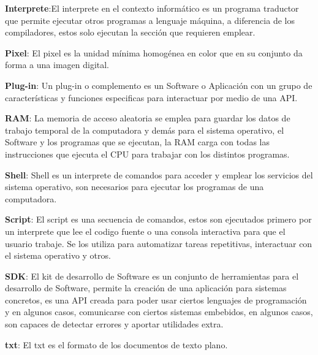 \textbf{Interprete}:El interprete en el contexto informático es un programa traductor que permite ejecutar otros programas a lenguaje máquina, a diferencia de los compiladores, estos solo ejecutan la sección que requieren emplear.

\textbf{Pixel}: El pixel es la unidad mínima homogénea en color que en su conjunto da forma a una imagen digital.

\textbf{Plug-in}: Un plug-in o complemento es un Software o Aplicación con un grupo de características y funciones especificas para interactuar por medio de una API.

\textbf{RAM}: La memoria de acceso aleatoria se emplea para guardar los datos de trabajo temporal de la computadora y demás para el sistema operativo, el Software y los programas que se ejecutan, la RAM carga con todas las instrucciones que ejecuta el CPU para trabajar con los distintos programas.

\textbf{Shell}: Shell es un interprete de comandos para acceder y emplear los servicios del sistema operativo, son necesarios para ejecutar los programas de una computadora.

\textbf{Script}: El script es una secuencia de comandos, estos son ejecutados primero por un interprete que lee el codigo fuente o una consola interactiva para que el usuario trabaje. Se los utiliza para automatizar tareas repetitivas, interactuar con el sistema operativo y otros.

\textbf{SDK}: El kit de desarrollo de Software es un conjunto de herramientas para el desarrollo de Software, permite la creación de una aplicación para sistemas concretos, es una API creada para poder usar ciertos lenguajes de programación y en algunos casos, comunicarse con ciertos sistemas embebidos, en algunos casos, son capaces de detectar errores y aportar utilidades extra.

\textbf{txt}: El txt es el formato de los documentos de texto plano.





